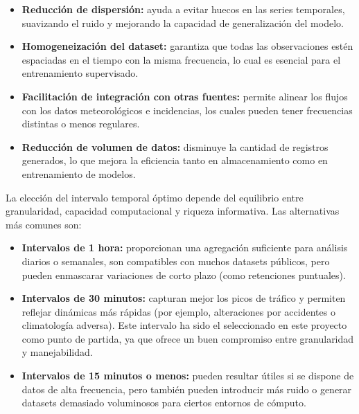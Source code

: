 \begin{itemize}
	\item \textbf{Reducción de dispersión:} ayuda a evitar huecos en las series temporales, suavizando el ruido y mejorando la capacidad de generalización del modelo.
	\item \textbf{Homogeneización del dataset:} garantiza que todas las observaciones estén espaciadas en el tiempo con la misma frecuencia, lo cual es esencial para el entrenamiento supervisado.
	\item \textbf{Facilitación de integración con otras fuentes:} permite alinear los flujos con los datos meteorológicos e incidencias, los cuales pueden tener frecuencias distintas o menos regulares.
	\item \textbf{Reducción de volumen de datos:} disminuye la cantidad de registros generados, lo que mejora la eficiencia tanto en almacenamiento como en entrenamiento de modelos.
\end{itemize}

\vspace{1em}
\noindent La elección del intervalo temporal óptimo depende del equilibrio entre granularidad, capacidad computacional y riqueza informativa. Las alternativas más comunes son:

\begin{itemize}
	\item \textbf{Intervalos de 1 hora:} proporcionan una agregación suficiente para análisis diarios o semanales, son compatibles con muchos datasets públicos, pero pueden enmascarar variaciones de corto plazo (como retenciones puntuales).
	
	\item \textbf{Intervalos de 30 minutos:} capturan mejor los picos de tráfico y permiten reflejar dinámicas más rápidas (por ejemplo, alteraciones por accidentes o climatología adversa). Este intervalo ha sido el seleccionado en este proyecto como punto de partida, ya que ofrece un buen compromiso entre granularidad y manejabilidad.
	
	\item \textbf{Intervalos de 15 minutos o menos:} pueden resultar útiles si se dispone de datos de alta frecuencia, pero también pueden introducir más ruido o generar datasets demasiado voluminosos para ciertos entornos de cómputo.
\end{itemize}

